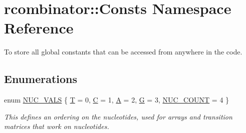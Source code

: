 \hypertarget{namespacercombinator_1_1Consts}{}\section{rcombinator\+:\+:Consts Namespace Reference}
\label{namespacercombinator_1_1Consts}


To store all global constants that can be accessed from anywhere in the code.  


\subsection*{Enumerations}
\begin{DoxyCompactItemize}
\item 
enum \mbox{\hyperlink{namespacercombinator_1_1Consts_aaa096a23d1bc2fdb1992265192fae907}{N\+U\+C\+\_\+\+V\+A\+LS}} \{ \newline
\mbox{\hyperlink{namespacercombinator_1_1Consts_aaa096a23d1bc2fdb1992265192fae907a28700244abb5c707ccefb9bde756e436}{T}} = 0, 
\mbox{\hyperlink{namespacercombinator_1_1Consts_aaa096a23d1bc2fdb1992265192fae907af522785f2f571764ccee708d2fe93095}{C}} = 1, 
\mbox{\hyperlink{namespacercombinator_1_1Consts_aaa096a23d1bc2fdb1992265192fae907aca9ee451a44f492976f6b64caef761a1}{A}} = 2, 
\mbox{\hyperlink{namespacercombinator_1_1Consts_aaa096a23d1bc2fdb1992265192fae907a5020e318d196247b860e9fe541f74d33}{G}} = 3, 
\newline
\mbox{\hyperlink{namespacercombinator_1_1Consts_aaa096a23d1bc2fdb1992265192fae907aa51005e405016569840eefdd20caf39b}{N\+U\+C\+\_\+\+C\+O\+U\+NT}} = 4
 \}
\begin{DoxyCompactList}\small\item\em This defines an ordering on the nucleotides, used for arrays and transition matrices that work on nucleotides. \end{DoxyCompactList}\end{DoxyCompactItemize}
